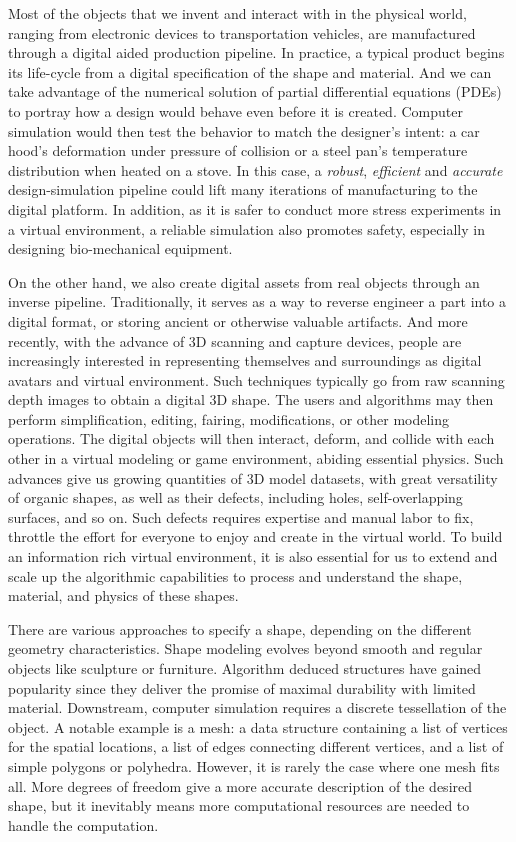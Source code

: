 Most of the objects that we invent and interact with in the physical world, ranging from electronic devices to transportation vehicles, are manufactured through a digital aided production pipeline.
In practice, a typical product begins its life-cycle from a digital specification of the shape and material. 
And we can take advantage of the numerical solution of partial differential equations (PDEs) to portray how a design would behave even before it is created.
Computer simulation would then test the behavior to match the designer's intent: a car hood's deformation under pressure of collision or a steel pan's temperature distribution when heated on a stove. In this case, a \emph{robust}, \emph{efficient} and \emph{accurate} design-simulation pipeline could lift many iterations of manufacturing to the digital platform. In addition, as it is safer to conduct more stress experiments in a virtual environment, a reliable simulation also promotes safety, especially in designing bio-mechanical equipment.

On the other hand, we also create digital assets from real objects through an inverse pipeline. Traditionally, it serves as a way to reverse engineer a part into a digital format, or storing ancient or otherwise valuable artifacts. And more recently, with the advance of 3D scanning and capture devices, people are increasingly interested in representing themselves and surroundings as digital avatars and virtual environment. Such techniques typically go from raw scanning depth images to obtain a digital 3D shape. The users and algorithms may then perform simplification, editing, fairing, modifications, or other modeling operations. The digital objects will then interact, deform, and collide with each other in a virtual modeling or game environment, abiding essential physics.
Such advances give us growing quantities of 3D model datasets, with great versatility of organic shapes, as well as their defects, including holes, self-overlapping surfaces, and so on. Such defects requires expertise and manual labor to fix, throttle the effort for everyone to enjoy and create in the virtual world. To build an information rich virtual environment, it is also essential for us to extend and scale up the algorithmic capabilities to process and understand the shape, material, and physics of these shapes.

There are various approaches to specify a shape, depending on the different geometry characteristics. Shape modeling evolves beyond smooth and regular objects like sculpture or furniture. Algorithm deduced structures have gained popularity since they deliver the promise of maximal durability with limited material. Downstream, computer simulation requires a discrete tessellation of the object. A notable example is a mesh: a data structure containing a list of vertices for the spatial locations, a list of edges connecting different vertices, and a list of simple polygons or polyhedra. However, it is rarely the case where one mesh fits all. More degrees of freedom give a more accurate description of the desired shape, but it inevitably means more computational resources are needed to handle the computation.

